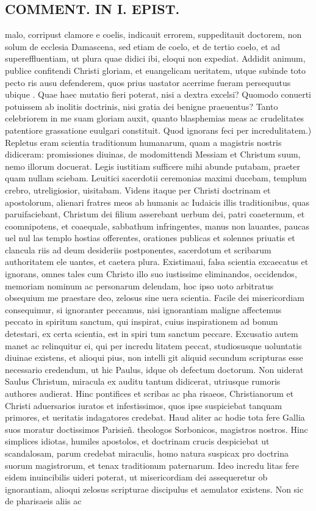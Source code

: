 \documentclass{article}
\begin{document}
\begin{pages}
\section*{COMMENT. IN I. EPIST. }
\marginpar{[ p.474 ]}\pstart malo, corripust clamore e coelis, indicauit errorem, suppeditauit doctorem, non solum de ecclesia Damascena, sed etiam de coelo, et de tertio coelo, et ad supereffluentiam, ut plura quae didici ibi, eloqui non expediat. Addidit animum, publice confitendi Christi gloriam, et euangelicam ueritatem, utque subinde toto pecto ris ausu defenderem, quos prius uastator acerrime fueram persequutus ubique . Quae haec mutatio fieri poterat, nisi a dextra excelsi? Quomodo conuerti potuissem ab inolitis doctrinis, nisi gratia dei benigne praeuentus? Tanto celebriorem in me suam gloriam auxit, quanto blasphemias meas ac crudelitates patentiore grassatione euulgari constituit. Quod ignorans feci per incredulitatem.) Repletus eram scientia traditionum humanarum, quam a magistris nostris didiceram: promissiones diuinas, de modomittendi Messiam et Christum suum, nemo illorum docuerat. Legis iustitiam sufficere mihi abunde putabam, praeter quam nullam sciebam. Leuitici sacerdotii ceremonias maximi ducebam, templum crebro, utreligiosior, uisitabam. Videns itaque per Christi doctrinam et apostolorum, alienari fratres meos ab humanis ac Iudaicis illis traditionibus, quas paruifaciebant, Christum dei filium asserebant uerbum dei, patri coaeternum, et coomnipotens, et coaequale, sabbathum infringentes, manus non lauantes, paucas uel nul las templo hostias offerentes, orationes publicas et solennes priuatis et clancula riis ad deum desideriis postponentes, sacerdotum et scribarum authoritatem ele uantes, et caetera plura. Existimaui, falsa scientia excaecatus et ignorans, omnes tales cum Christo illo suo iustissime eliminandos, occidendos, memoriam nominum ac personarum delendam, hoc ipso uoto arbitratus obsequium me praestare deo, zelosus sine uera scientia. Facile dei misericordiam consequimur, si ignoranter peccamus, nisi ignorantiam maligne affectemus peccato in spiritum sanctum, qui inspirat, cuius inspirationem ad bonum detestari, ex certa scientia, est in spiri tum sanctum peccare. Excusatio autem manet ac relinquitur ei, qui per incredu litatem peccat, studiosusque uoluntatis diuinae existens, et alioqui pius, non intelli git aliquid secundum scripturas esse necessario credendum, ut hic Paulus, idque ob defectum doctorum. Non uiderat Saulus Christum, miracula ex auditu tantum didicerat, utriusque rumoris authores audierat. Hinc pontifices et scribas ac pha risaeos, Christianorum et Christi aduersarios iuratos et infestissimos, quos ipse suspiciebat tanquam primores, et ueritatis indagatores credebat. Haud aliter ac hodie tota fere Gallia suos moratur doctissimos Parisieñ. theologos Sorbonicos, magistros nostros. Hinc simplices idiotas, humiles apostolos, et doctrinam crucis despiciebat ut scandalosam, parum credebat miraculis, homo natura suspicax pro doctrina suorum magistrorum, et tenax traditionum paternarum. Ideo incredu litas fere eidem inuincibilis uideri poterat, ut misericordiam dei assequeretur ob ignorantiam, alioqui zelosus scripturae discipulus et aemulator existens. Non sic de pharisaeis aliis ac 
\end{pages}
\end{document}
